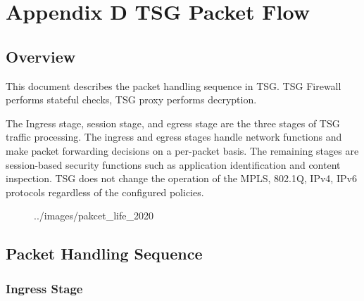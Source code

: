 %
\chapter*{\hypertarget{link:Appendix D TSG Packet Flow}{Appendix D TSG Packet Flow}}
\label{sec:appendix_e}

\section*{\hypertarget{link:Overview}{Overview}}
\label{sec:appendix_e:overview}

This document describes the packet handling sequence in TSG. TSG Firewall performs stateful checks, TSG proxy performs decryption. 


The Ingress stage, session stage, and egress stage are the three stages of TSG traffic processing. 
The ingress and egress stages handle network functions and make packet forwarding decisions on a per-packet basis. 
The remaining stages are session-based security functions such as application identification and content inspection. 
TSG does not change the operation of the MPLS, 802.1Q, IPv4, IPv6 protocols regardless of the configured policies.


\begin{figure}[htb]
    \centering
    {../images/pakcet_life_2020}
\end{figure}

\section*{\hypertarget{link:Packet Handling Sequence}{Packet Handling Sequence}}
\label{sec:appendix_e:sequence}

\subsection*{\hypertarget{link:Ingress Stage}{Ingress Stage}}
\label{sec:appendix_e:sequence:ingress}

